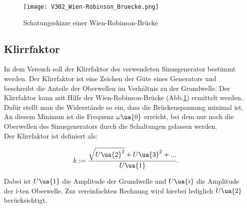 \begin{figure}
  \texttt{[image: V302\_Wien-Robinson\_Bruecke.png]}
  \caption{Schatungsskizze einer Wien-Robinson-Brücke\cite{anleitung01}}
  \label{fig:Wien-Robinson-Brücke}
\end{figure}

\subsection{Klirrfaktor}

In dem Versuch soll der Klirrfaktor des verwendeten Sinusgenerator bestimmt werden.
Der Klirrfaktor ist eine Zeichen der Güte eines Generators und beschreibt die
Anteile der Oberwellen im Verhältnis zu der Grundwelle.
Der Klirrfaktor kann mit Hilfe der Wien-Robinson-Brücke (Abb.\ref{fig:Wien-Robinson-Brücke})
ermittelt werden. Dafür stellt man die Widerstände so ein, dass die Brückenspannung
minimal ist. An diesem Minimun ist die Frequenz $\omega\ua{0}$ erreicht, bei dem
nur noch die Oberwellen des Sinusgenerators durch die Schaltungen gelassen werden.\\
Der Klirrfaktor ist definiert als:

\begin{equation}
  \label{eqn:Klirrfaktor}
  k := \frac{\sqrt{U\ua{2}^2} + U\ua{3}^2 + ... }{U\ua{1}}.
\end{equation}

Dabei ist $U\ua{1}$ die Amplitude der Grundwelle und $U\ua{i}$ die Amplitude der
i-ten Oberwelle. Zur vereinfachten Rechnung wird hierbei lediglich $U\ua{2}$
berücksichtigt.



\printbibliography


